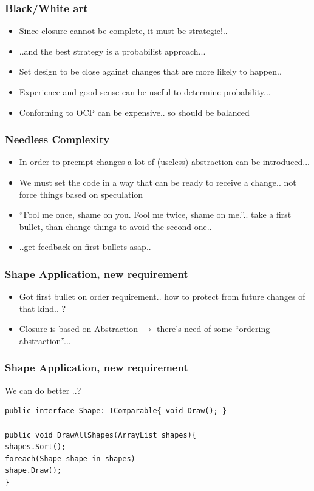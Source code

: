 \documentclass{beamer}
\begin{document}
\begin{frame}
  \frametitle{Black/White art}
  \begin{itemize}
	\item<+-> Since closure cannot be complete, it must be strategic!..
	\item<+-> ..and the best strategy is a probabilist approach...
	\item<+-> Set design to be close against changes that are more likely to happen..
	\item<+-> Experience and good sense can be useful to determine probability... 
	\item<+-> Conforming to OCP can be expensive.. so should be balanced
   \end{itemize}
\end{frame}

\begin{frame}
  \frametitle{Needless Complexity}
  \begin{itemize}
	\item<+-> In order to preempt changes a lot of (useless) abstraction can be introduced...
	\item<+-> We must set the code in a way that can be ready to receive a change.. not force things based on speculation
	\item<+-> ``Fool me once, shame on you. Fool me twice, shame on me.''.. take a first bullet, than change things to avoid the second one..
	\item<+-> ..get feedback on first bullets asap..
   \end{itemize}
\end{frame}

\begin{frame}
  \frametitle{Shape Application, new requirement}
  \begin{itemize}
	\item<+-> Got first bullet on order requirement.. how to protect from future changes of \underline{that kind}.. ?
	\item<+-> Closure is based on Abstraction $ \rightarrow $ there's need of some ``ordering abstraction''...
   \end{itemize}
\end{frame}

\begin{frame}[containsverbatim]
	\frametitle{Shape Application, new requirement}
	We can do better ..?\\
	\begin{lstlisting}
public interface Shape: IComparable{ void Draw(); }

public void DrawAllShapes(ArrayList shapes){
shapes.Sort();
foreach(Shape shape in shapes)
shape.Draw();
}

	\end{lstlisting}
\end{frame}
\end{document}
